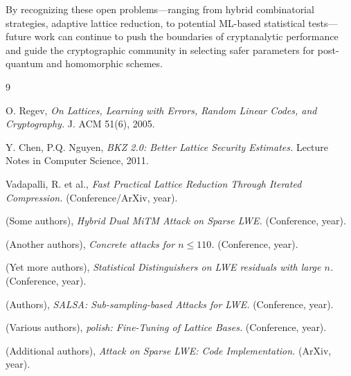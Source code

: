 \documentclass[11pt]{article}
\begin{document}
By recognizing these open problems—ranging from hybrid combinatorial strategies, adaptive lattice reduction, to potential ML-based statistical tests—future work can continue to push the boundaries of cryptanalytic performance and guide the cryptographic community in selecting safer parameters for post-quantum and homomorphic schemes.


\begin{thebibliography}{9}

O. Regev,
\emph{On Lattices, Learning with Errors, Random Linear Codes, and Cryptography.}
J. ACM 51(6), 2005.

Y. Chen, P.Q. Nguyen,
\emph{BKZ 2.0: Better Lattice Security Estimates.}
Lecture Notes in Computer Science, 2011.

Vadapalli, R. et al.,
\emph{Fast Practical Lattice Reduction Through Iterated Compression.}
(Conference/ArXiv, year).

(Some authors),
\emph{Hybrid Dual MiTM Attack on Sparse LWE.}
(Conference, year).

(Another authors),
\emph{Concrete attacks for $n\leq 110$.}
(Conference, year).

(Yet more authors),
\emph{Statistical Distinguishers on LWE residuals with large $n$.}
(Conference, year).

(Authors),
\emph{SALSA: Sub-sampling-based Attacks for LWE.}
(Conference, year).

(Various authors),
\emph{polish: Fine-Tuning of Lattice Bases.}
(Conference, year).

(Additional authors),
\emph{Attack on Sparse LWE: Code Implementation.}
(ArXiv, year).

\end{thebibliography}
\end{document}
